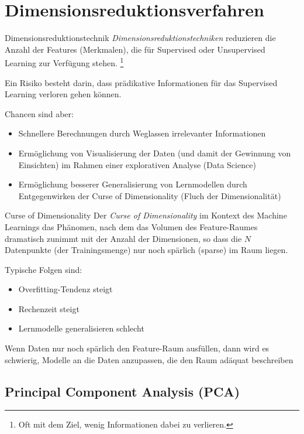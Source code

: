\section{Dimensionsreduktionsverfahren}

\begin{defi}{Dimensionsreduktionstechnik}
    \emph{Dimensionsreduktionstechniken} reduzieren die Anzahl der Features (Merkmalen), die für Supervised oder Unsupervised Learning zur Verfügung stehen.
    \footnote{
        Oft mit dem Ziel, wenig Informationen dabei zu verlieren.
    }

    Ein Risiko besteht darin, dass prädikative Informationen für das Supervised Learning verloren gehen können.

    Chancen sind aber:
    \begin{itemize}
        \item Schnellere Berechnungen durch Weglassen irrelevanter Informationen
        \item Ermöglichung von Visualisierung der Daten (und damit der Gewinnung von Einsichten) im Rahmen einer explorativen Analyse (Data Science)
        \item Ermöglichung besserer Generalisierung von Lernmodellen durch Entgegenwirken der Curse of Dimensionality (Fluch der Dimensionalität)
    \end{itemize}
\end{defi}

\begin{bonus}{Curse of Dimensionality}
    Der \emph{Curse of Dimensionality} im Kontext des Machine Learnings das Phänomen, nach dem das Volumen des Feature-Raumes dramatisch zunimmt mit der Anzahl der Dimensionen, so dass die $N$ Datenpunkte (der Trainingsmenge) nur noch spärlich (sparse) im Raum liegen.

    Typische Folgen sind:
    \begin{itemize}
        \item Overfitting-Tendenz steigt
        \item Rechenzeit steigt
        \item Lernmodelle generalisieren schlecht
    \end{itemize}

    Wenn Daten nur noch spärlich den Feature-Raum ausfüllen, dann wird es schwierig, Modelle an die Daten anzupassen, die den Raum adäquat beschreiben
\end{bonus}

\subsection{Principal Component Analysis (PCA)}

